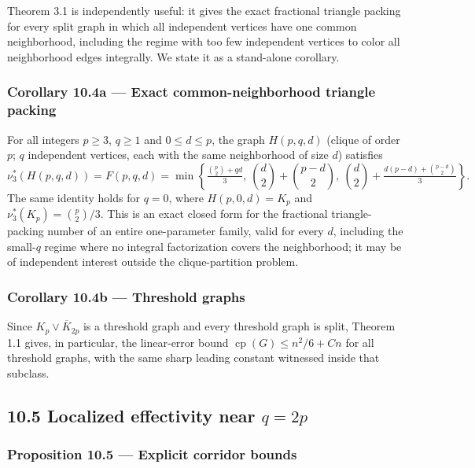 \documentclass[
  11pt,
]{article}
\begin{document}
Theorem 3.1 is independently useful: it gives the exact fractional
triangle packing for every split graph in which all independent vertices
have one common neighborhood, including the regime with too few
independent vertices to color all neighborhood edges integrally. We
state it as a stand-alone corollary.

\subsubsection{Corollary 10.4a --- Exact common-neighborhood triangle
packing}\label{corollary-10.4a-exact-common-neighborhood-triangle-packing}

For all integers \(p\ge3\), \(q\ge1\) and \(0\le d\le p\), the graph
\(H(p,q,d)\) (clique of order \(p\); \(q\) independent vertices, each
with the same neighborhood of size \(d\)) satisfies \[
\nu_3^*(H(p,q,d))=F(p,q,d)=\min\left\{\tfrac{\binom p2+qd}{3},\ \binom d2+\binom{p-d}2,\ \binom d2+\tfrac{d(p-d)+\binom{p-d}2}{3}\right\}.
\] The same identity holds for \(q=0\), where \(H(p,0,d)=K_p\) and
\(\nu_3^*(K_p)=\binom p2/3\). This is an exact closed form for the
fractional triangle-packing number of an entire one-parameter family,
valid for every \(d\), including the small-\(q\) regime where no
integral factorization covers the neighborhood; it may be of independent
interest outside the clique-partition problem.

\subsubsection{Corollary 10.4b --- Threshold
graphs}\label{corollary-10.4b-threshold-graphs}

Since \(K_p\vee\overline K_{2p}\) is a threshold graph and every
threshold graph is split, Theorem 1.1 gives, in particular, the
linear-error bound \(\operatorname{cp}(G)\le n^2/6+Cn\) for all
threshold graphs, with the same sharp leading constant witnessed inside
that subclass.

\subsection{\texorpdfstring{10.5 Localized effectivity near
\(q=2p\)}{10.5 Localized effectivity near q=2p}}\label{localized-effectivity-near-q2p}

\subsubsection{Proposition 10.5 --- Explicit corridor
bounds}\label{proposition-10.5-explicit-corridor-bounds}
\end{document}
